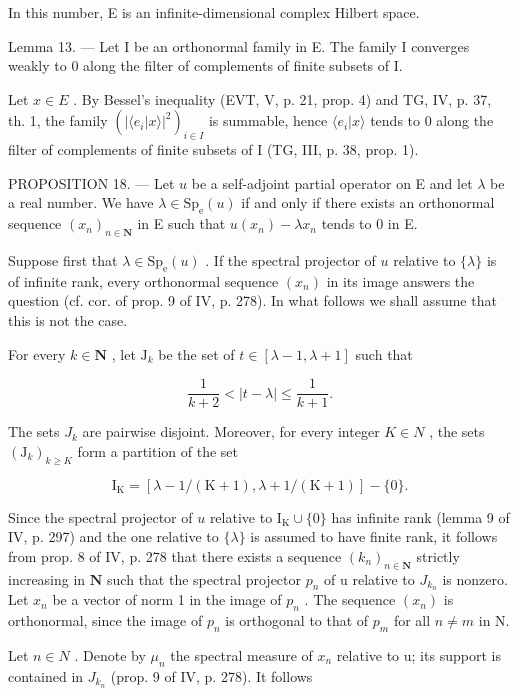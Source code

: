 In this number, E is an infinite-dimensional complex Hilbert space.

Lemma 13. --- Let I be an orthonormal family in E. The family I converges weakly to 0 along the filter of complements of finite subsets of I.

Let \(x \in E\) . By Bessel's inequality (EVT, V, p. 21, prop. 4) and TG, IV, p. 37, th. 1, the family \((|\langle e_{i} | x\rangle|^{2})_{i\in I}\) is summable, hence \(\langle e_{i} | x\rangle\) tends to 0 along the filter of complements of finite subsets of I (TG, III, p. 38, prop. 1).

PROPOSITION 18. --- Let \(u\) be a self-adjoint partial operator on E and let \(\lambda\) be a real number. We have \(\lambda \in \mathrm{Sp}_{\mathrm{e}}(u)\) if and only if there exists an orthonormal sequence \((x_{n})_{n \in \mathbf{N}}\) in E such that \(u(x_{n}) - \lambda x_{n}\) tends to 0 in E.

Suppose first that \(\lambda \in \mathrm{Sp}_{\mathrm{e}}(u)\) . If the spectral projector of \(u\) relative to \(\{\lambda\}\) is of infinite rank, every orthonormal sequence \((x_{n})\) in its image answers the question (cf. cor. of prop. 9 of IV, p. 278). In what follows we shall assume that this is not the case.

For every \(k \in \mathbf{N}\) , let \(\mathrm{J}_k\) be the set of \(t \in [\lambda - 1, \lambda + 1]\) such that

\[
{\frac {1}{k + 2}} <   | t - \lambda | \leqslant {\frac {1}{k + 1}}.
\]

The sets \(J_{k}\) are pairwise disjoint. Moreover, for every integer \(K \in N\) , the sets \((\mathrm{J}_{k})_{k \geqslant K}\) form a partition of the set

\[
\mathrm{I} _ {\mathrm{K}} = [ \lambda - 1 / (\mathrm{K} + 1), \lambda + 1 / (\mathrm{K} + 1) ] - \{0 \}.
\]

Since the spectral projector of \(u\) relative to \(\mathrm{I_K} \cup \{0\}\) has infinite rank (lemma 9 of IV, p. 297) and the one relative to \(\{\lambda\}\) is assumed to have finite rank, it follows from prop. 8 of IV, p. 278 that there exists a sequence \((k_n)_{n \in \mathbf{N}}\) strictly increasing in \(\mathbf{N}\) such that the spectral projector \(p_{n}\) of u relative to \(J_{k_{n}}\) is nonzero. Let \(x_{n}\) be a vector of norm 1 in the image of \(p_{n}\) . The sequence \((x_{n})\) is orthonormal, since the image of \(p_{n}\) is orthogonal to that of \(p_{m}\) for all \(n \neq m\) in N.

Let \(n \in N\) . Denote by \(\mu_{n}\) the spectral measure of \(x_{n}\) relative to u; its support is contained in \(J_{k_{n}}\) (prop. 9 of IV, p. 278). It follows

